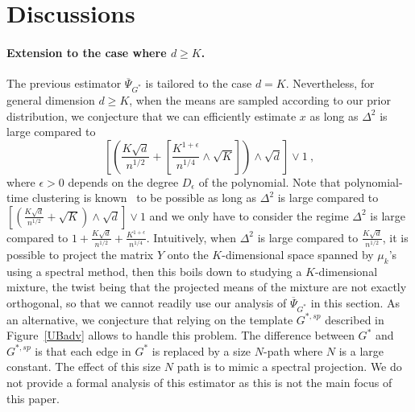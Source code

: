 \documentclass{article}
\newcommand{\alex}[1]{\textcolor{magenta}{[alex: #1]}}
\begin{document}
        
        
\section{Discussions}\label{sec:discussion}



       \paragraph{Extension to the case where $d\geq K$.} The previous estimator $\overline{\Psi}_{G^*}$ is tailored to the case $d = K$. Nevertheless, for general dimension $d\geq K$, when the means are sampled according to our prior distribution, we conjecture that  we can efficiently estimate $x$ as long as $\Delta^2$ is large compared to 
        \[
        \left[\left(\frac{K\sqrt{d}}{n^{1/2}}+ \left[\frac{K^{1+\epsilon} }{n^{1/4}} \land \sqrt{K}\right] \right)\land \sqrt{d} \right] \lor 1\ ,
        \]
        where $\epsilon>0$ depends on the degree $D_{\epsilon}$ of the polynomial. Note that polynomial-time clustering is known~\cite{Even25} to be possible as long as $\Delta^2$ is large compared to
        $\left[\left(\frac{K\sqrt{d}}{n^{1/2}}+ \sqrt{K} \right)\land \sqrt{d} \right] \lor 1$ and we only have to consider the regime $\Delta^2$ is large compared to $1+ \frac{K\sqrt{d}}{n^{1/2}}+ \frac{K^{1+\epsilon} }{n^{1/4}}$. Intuitively, when $\Delta^2$ is large compared to $\frac{K\sqrt{d}}{n^{1/2}}$, it is possible to project the matrix $Y$ onto the $K$-dimensional space spanned by $\mu_k$'s using a spectral method, then this boils down to studying a $K$-dimensional mixture, the twist being that the projected means of the mixture are not exactly orthogonal, so that we cannot readily use our analysis of $\overline{\Psi}_{G^*}$ in this section. As an alternative, we conjecture that relying on the template $G^{*,sp}$ described in Figure~\ref{UBadv} allows to handle this problem. The difference between $G^*$ and $G^{*,sp}$ is that each edge in $G^{*}$ is replaced by a size $N$-path where $N$ is a large constant. The effect of this size $N$ path is to mimic a spectral projection. We do not provide a formal analysis of this estimator as this is not the main focus of this paper.
\end{document}
